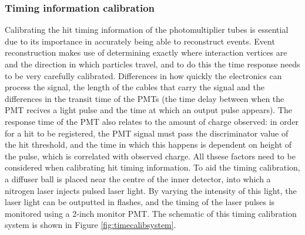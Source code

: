 \subsubsection{Timing information calibration}
Calibrating the hit timing information of the photomultiplier tubes is essential due to its importance in accurately being able to reconstruct events. Event reconstruction makes use of determining exactly where interaction vertices are and the direction in which particles travel, and to do this the time response needs to be very carefully calibrated. Differences in how quickly the electronics can process the signal, the length of the cables that carry the signal and the differences in the transit time of the PMTs (the time delay between when the PMT recives a light pulse and the time at which an output pulse appears). The response time of the PMT also relates to the amount of charge observed: in order for a hit to be registered, the PMT signal must pass the discriminator value of the hit threshold, and the time in which this happens is dependent on height of the pulse, which is correlated with observed charge. All thsese factors need to be considered when calibrating hit timing information.
\newline
To aid the timing calibration, a diffuser ball is placed near the centre of the inner detector, into which a nitrogen laser injects pulsed laser light. By varying the intensity of this light, the laser light can be outputted in flashes, and the timing of the laser pulses is monitored using a 2-inch monitor PMT. The schematic of this timing calibration system is shown in Figure \ref{fig:timecalibsystem}.

